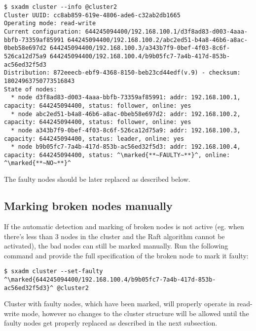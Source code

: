 \begin{lstlisting}
$ sxadm cluster --info @cluster2
Cluster UUID: cc8ab859-619e-4806-ade6-c32ab2db1665
Operating mode: read-write
Current configuration: 644245094400/192.168.100.1/d3f8ad83-d003-4aaa-bbfb-73359af85991 644245094400/192.168.100.2/abc2ed51-b4a8-46b6-a8ac-0beb58e697d2 644245094400/192.168.100.3/a343b7f9-0bef-4f03-8c6f-526ca12d75a9 644245094400/192.168.100.4/b9b05fc7-7a4b-417d-853b-ac56ed32f5d3 
Distribution: 872eeecb-ebf9-4368-8150-beb23cd44edf(v.9) - checksum: 18024963750773516843
State of nodes:
  * node d3f8ad83-d003-4aaa-bbfb-73359af85991: addr: 192.168.100.1, capacity: 644245094400, status: follower, online: yes
  * node abc2ed51-b4a8-46b6-a8ac-0beb58e697d2: addr: 192.168.100.2, capacity: 644245094400, status: follower, online: yes
  * node a343b7f9-0bef-4f03-8c6f-526ca12d75a9: addr: 192.168.100.3, capacity: 644245094400, status: leader, online: yes
  * node b9b05fc7-7a4b-417d-853b-ac56ed32f5d3: addr: 192.168.100.4, capacity: 644245094400, status: ^\marked{**~FAULTY~**}^, online: ^\marked{**~NO~**}^
\end{lstlisting}
The faulty nodes should be later replaced as described below.

\subsection{Marking broken nodes manually}
If the automatic detection and marking of broken nodes is not active (eg. when
there's less than 3 nodes in the cluster and the Raft algorithm cannot be
activated), the bad nodes can still be marked manually. Run the following
command and provide the full specification of the broken node to mark it
faulty:
\begin{lstlisting}
$ sxadm cluster --set-faulty ^\marked{644245094400/192.168.100.4/b9b05fc7-7a4b-417d-853b-ac56ed32f5d3}^ @cluster2
\end{lstlisting}
Cluster with faulty nodes, which have been marked, will properly operate in
read-write mode, however no changes to the cluster structure will be allowed
until the faulty nodes get properly replaced as described in the next
subsection.

